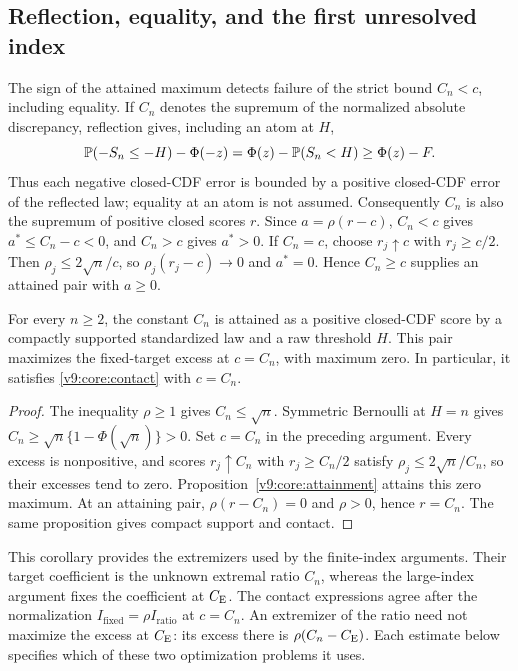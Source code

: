 \subsection{Reflection, equality, and the first unresolved index}
\label{v9:core:reflection}
The sign of the attained maximum detects failure of the strict bound $C_n<c$,
including equality. If $C_n$ denotes the supremum of the normalized
absolute discrepancy, reflection gives, including an atom at $H$,
\[
 \mathbb P(-S_n\le-H)-\Phi(-z)
 =\Phi(z)-\mathbb P(S_n<H)\ge\Phi(z)-F.
\]
Thus each negative closed-CDF error is bounded by a positive closed-CDF
error of the reflected law; equality at an atom is not assumed.
Consequently $C_n$ is also the supremum of positive
closed scores $r$. Since $a=\rho(r-c)$, $C_n<c$ gives
$a^*\le C_n-c<0$, and $C_n>c$ gives $a^*>0$. If $C_n=c$, choose
$r_j\uparrow c$ with $r_j\ge c/2$. Then
$\rho_j\le2\sqrt n/c$, so $\rho_j(r_j-c)\to0$ and $a^*=0$.
Hence $C_n\ge c$ supplies an attained pair with $a\ge0$.

\begin{corollary}
\label{ext:ratio-attainment}
For every $n\ge2$, the constant $C_n$ is attained as a positive
closed-CDF score by a compactly supported standardized law and a raw
threshold $H$. This pair maximizes the fixed-target excess at $c=C_n$,
with maximum zero. In particular, it satisfies
\eqref{v9:core:contact} with $c=C_n$.
\end{corollary}
\begin{proof}
The inequality $\rho\ge1$ gives $C_n\le\sqrt n$. Symmetric Bernoulli
at $H=n$ gives $C_n\ge\sqrt n\{1-\Phi(\sqrt n)\}>0$.
Set $c=C_n$ in the preceding argument. Every excess is nonpositive,
and scores $r_j\uparrow C_n$ with $r_j\ge C_n/2$ satisfy
$\rho_j\le2\sqrt n/C_n$, so their excesses tend to zero.
Proposition~\ref{v9:core:attainment} attains this zero maximum.
At an attaining pair, $\rho(r-C_n)=0$ and $\rho>0$, hence $r=C_n$.
The same proposition gives compact support and contact.
\end{proof}

This corollary provides the extremizers used by the finite-index
arguments. Their target coefficient is the unknown extremal ratio
$C_n$, whereas the large-index argument fixes the coefficient at $C_{\mathrm E}$.
The contact expressions agree after the normalization
$I_{\mathrm{fixed}}=\rho I_{\mathrm{ratio}}$ at $c=C_n$.
An extremizer of the ratio need not maximize the excess at $C_{\mathrm E}$:
its excess there is $\rho(C_n-C_{\mathrm E})$. Each estimate below specifies
which of these two optimization problems it uses.

